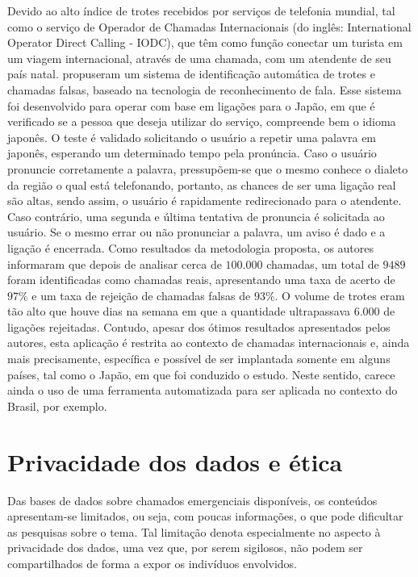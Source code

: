 Devido ao alto índice de trotes recebidos por serviços de telefonia mundial, tal como o serviço de Operador de Chamadas Internacionais (do inglês: International Operator Direct Calling - IODC), que têm como função conectar um turista em um viagem internacional, através de uma chamada, com um atendente de seu país natal. \cite{kuroiwa2004automatic} propuseram um sistema de identificação automática de trotes e chamadas falsas, baseado na tecnologia de reconhecimento de fala. Esse sistema foi desenvolvido para operar com base em ligações para o Japão, em que é verificado se a pessoa que deseja utilizar do serviço, compreende bem o idioma japonês. O teste é validado solicitando o usuário a repetir uma palavra em japonês, esperando um determinado tempo pela pronúncia. Caso o usuário pronuncie corretamente a palavra, pressupõem-se que o mesmo conhece o dialeto da região o qual está telefonando, portanto, as chances de ser uma ligação real são altas, sendo assim, o usuário é rapidamente redirecionado para o atendente. Caso contrário, uma segunda e última tentativa de pronuncia é solicitada ao usuário. Se o mesmo errar ou não pronunciar a palavra, um aviso é dado e a ligação é encerrada. Como resultados da metodologia proposta, os autores informaram que depois de analisar cerca de $100.000$ chamadas, um total de $9489$ foram identificadas como chamadas reais, apresentando uma taxa de acerto de $97\%$ e um taxa de rejeição de chamadas falsas de $93\%$. O volume de trotes eram tão alto que houve dias na semana em que a quantidade ultrapassava $6.000$ de ligações rejeitadas. Contudo, apesar dos ótimos resultados apresentados pelos autores, esta aplicação é restrita ao contexto de chamadas internacionais e, ainda mais precisamente, específica e possível de ser implantada somente em alguns países, tal como o Japão, em que foi conduzido o estudo. Neste sentido, carece ainda o uso de uma ferramenta automatizada para ser aplicada no contexto do Brasil, por exemplo.

\section{Privacidade dos dados e ética}
Das bases de dados sobre chamados emergenciais disponíveis, os conteúdos apresentam-se limitados, ou seja, com poucas informações, o que pode dificultar as pesquisas sobre o tema. Tal limitação denota  especialmente no aspecto à privacidade dos dados, uma vez que, por serem sigilosos, não podem ser compartilhados de forma a expor os indivíduos envolvidos.

